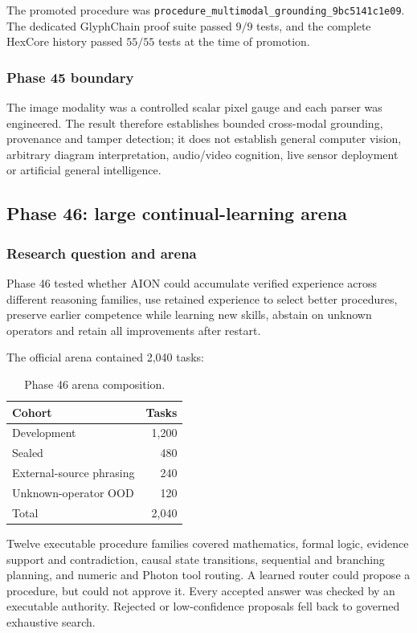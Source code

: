 The promoted procedure was
\texttt{procedure\_multimodal\_grounding\_9bc5141c1e09}.
The dedicated GlyphChain proof suite passed \(9/9\) tests, and the complete
HexCore history passed \(55/55\) tests at the time of promotion.

\subsubsection{Phase 45 boundary}

The image modality was a controlled scalar pixel gauge and each parser was
engineered.  The result therefore establishes bounded cross-modal grounding,
provenance and tamper detection; it does not establish general computer
vision, arbitrary diagram interpretation, audio/video cognition, live sensor
deployment or artificial general intelligence.

\subsection{Phase 46: large continual-learning arena}
\label{subsec:phase46-continual-arena}

\subsubsection{Research question and arena}

Phase 46 tested whether AION could accumulate verified experience across
different reasoning families, use retained experience to select better
procedures, preserve earlier competence while learning new skills, abstain on
unknown operators and retain all improvements after restart.

The official arena contained 2,040 tasks:
\begin{table}[htbp]
\centering
\begin{tabular}{lr}
\hline
\textbf{Cohort} & \textbf{Tasks}\\
\hline
Development & 1,200\\
Sealed & 480\\
External-source phrasing & 240\\
Unknown-operator OOD & 120\\
\hline
Total & 2,040\\
\hline
\end{tabular}
\caption{Phase 46 arena composition.}
\label{tab:phase46-arena-composition}
\end{table}

Twelve executable procedure families covered mathematics, formal logic,
evidence support and contradiction, causal state transitions, sequential and
branching planning, and numeric and Photon tool routing.  A learned router
could propose a procedure, but could not approve it.  Every accepted answer
was checked by an executable authority.  Rejected or low-confidence proposals
fell back to governed exhaustive search.

